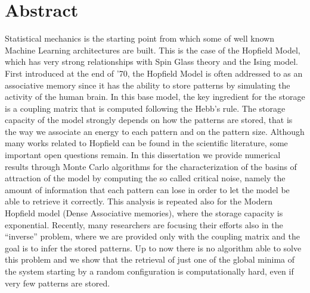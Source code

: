 \chapter*{Abstract}
Statistical mechanics is the starting point from which some of well known Machine Learning architectures are built. This is the case of the Hopfield Model, which has very strong relationships with Spin Glass theory and the Ising model. First introduced at the end of '70, the Hopfield Model is often addressed to as an associative memory since it has the ability to store patterns by simulating the activity of the human brain. In this base model, the key ingredient for the storage is a coupling matrix that is computed following the Hebb's rule. The storage capacity of the model strongly depends on how the patterns are stored, that is the way we associate an energy to each pattern and on the pattern size. Although many works related to Hopfield can be found in the scientific literature, some important open questions remain. In this dissertation we provide numerical results through Monte Carlo algorithms for the characterization of the basins of attraction of the model by computing the so called critical noise, namely the amount of information that each pattern can lose in order to let the model be able to retrieve it correctly. This analysis is repeated also for the Modern Hopfield model (Dense Associative memories), where the storage capacity is exponential.
Recently, many researchers are focusing their efforts also in the ``inverse'' problem, where we are provided only with the coupling matrix and the goal is to infer the stored patterns. Up to now there is no algorithm able to solve this problem and we show that the retrieval of just one of the global minima of the system starting by a random configuration is computationally hard, even if very few patterns are stored.